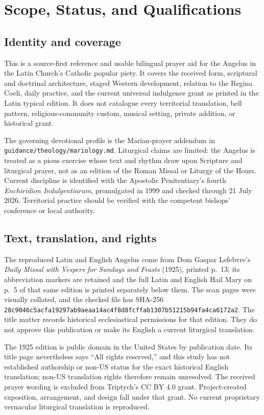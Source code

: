 \section{Scope, Status, and Qualifications}

\subsection{Identity and coverage}

This is a source-first reference and usable bilingual prayer aid for the Angelus in the Latin Church's Catholic popular piety. It covers the received form, scriptural and doctrinal architecture, staged Western development, relation to the Regina Coeli, daily practice, and the current universal indulgence grant as printed in the Latin typical edition. It does not catalogue every territorial translation, bell pattern, religious-community custom, musical setting, private addition, or historical grant.

The governing devotional profile is the Marian-prayer addendum in \texttt{guidance/theology/mariology.md}. Liturgical claims are limited: the Angelus is treated as a pious exercise whose text and rhythm draw upon Scripture and liturgical prayer, not as an edition of the Roman Missal or Liturgy of the Hours. Current discipline is identified with the Apostolic Penitentiary's fourth \textit{Enchiridion Indulgentiarum}, promulgated in 1999 and checked through 21 July 2026. Territorial practice should be verified with the competent bishops' conference or local authority.

\subsection{Text, translation, and rights}

The reproduced Latin and English Angelus come from Dom Gaspar Lefebvre's \textit{Daily Missal with Vespers for Sundays and Feasts} (1925), printed p.~13; its abbreviation markers are retained and the full Latin and English Hail Mary on p.~5 of that same edition is printed separately below them. The scan pages were visually collated, and the checked file has SHA-256 \texttt{28c9046c5acfa19297ab9aeaa14ac4f8d8fcffab1307b51215b94fa4ca6172a2}. The title matter records historical ecclesiastical permissions for that edition. They do not approve this publication or make its English a current liturgical translation.

The 1925 edition is public domain in the United States by publication date. Its title page nevertheless says ``All rights reserved,'' and this study has not established authorship or non-US status for the exact historical English translation; non-US translation rights therefore remain unresolved. The received prayer wording is excluded from Triptych's CC BY 4.0 grant. Project-created exposition, arrangement, and design fall under that grant. No current proprietary vernacular liturgical translation is reproduced.

